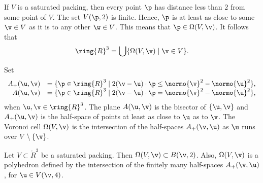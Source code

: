 \begin{remark}
If $V$ is a saturated packing, then every point $\p$ has distance less than $2$ from
some point of $V$.  The set $V(\p,2)$ is finite.  Hence, $\p$ is at least as close to some
$\v\in V$ as it is to any other $\w\in V$.  This means that $\p\in\Omega(V,\v)$.
It follows that
\begin{equation}\label{eqn:vor-rn}
\ring{R}^3 = \bigcup \{\Omega(V,\v)\mid \v \in V\}.
\end{equation}
\end{remark}

\begin{remark}
Set
\begin{displaymath}
\begin{array}{rll}
A_+(\u,\v) &= \{\p\in\ring{R}^3
\mid 2(\v-\u)\cdot \p \le \normo{\v}^2 - \normo{\u}^2 \},\\
A(\u,\v) &= \{\p\in\ring{R}^3
\mid 2(\v-\u)\cdot \p = \normo{\v}^2 - \normo{\u}^2 \},\\
\end{array}
\end{displaymath}
when $\u,\v\in\ring{R}^3$.  The plane $A(\u,\v)$ is the bisector of
$\{\u,\v\}$ and $A_+(\u,\v)$ is the half-space of points at least as
close to $\u$ as to $\v$.  The Voronoi cell $\Omega(V,\v)$ is the
intersection of the half-spaces $A_+(\v,\u)$ as $\u$ runs over
$V\setminus \{\v\}$.
\end{remark}

\begin{lemma}\label{lemma:V4}
Let $V\subset\ring{R}^3$ be a saturated packing.    Then $\Omega(V,\v)\subset  B(\v,2)$.
Also, $\Omega(V,\v)$ is a polyhedron defined by the intersection of the  finitely many
half-spaces $A_+(\v,\u)$, for $\u\in V(\v,4)$. 
\end{lemma}

